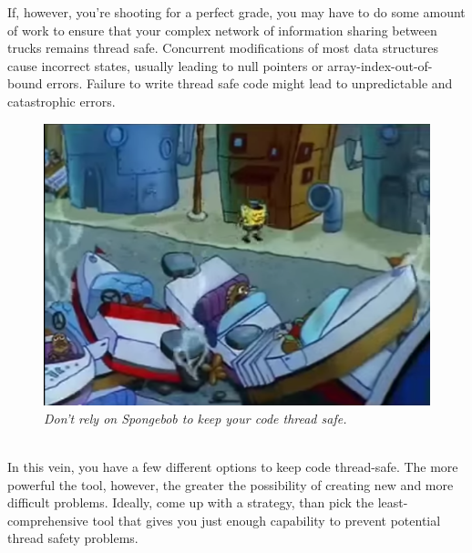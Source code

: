 \documentclass[11pt]{article}
\begin{document}
If, however, you're shooting for a perfect grade, you may have to do some amount of work to ensure that your complex network of information sharing between trucks remains thread safe. Concurrent modifications of most data structures cause incorrect states, usually leading to null pointers or array-index-out-of-bound errors. Failure to write thread safe code might lead to unpredictable and catastrophic errors.\\
\begin{figure}[h]
\centerline{\includegraphics[scale=0.2]{collision.png}} 
\caption{\em{Don't rely on Spongebob to keep your code thread safe.}}
\end{figure}
\\

In this vein, you have a few different options to keep code thread-safe. The more powerful the tool, however, the greater the possibility of creating new and more difficult problems. Ideally, come up with a strategy, than pick the least-comprehensive tool that gives you just enough capability to prevent potential thread safety problems.
\end{document}
